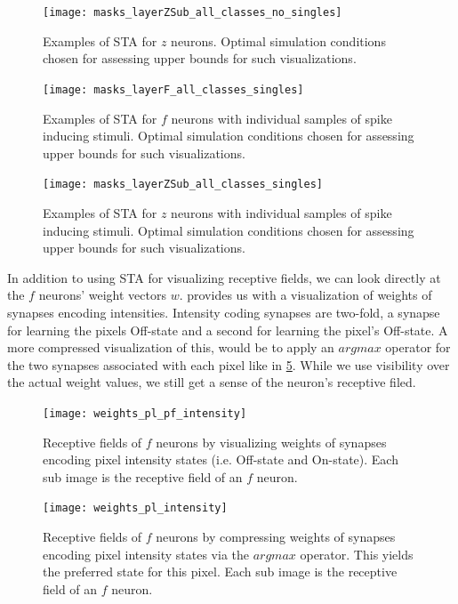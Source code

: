 \documentclass{report}
\begin{document}
\begin{figure}[ht]
\centering
\texttt{[image: masks\_layerZSub\_all\_classes\_no\_singles]}
\caption{Examples of STA for $z$ neurons. Optimal simulation conditions chosen for assessing upper bounds for such visualizations.
\label{fig:masks_layerZSub_all_classes_no_singles}}
\end{figure}

\begin{figure}[ht]
\centering
\texttt{[image: masks\_layerF\_all\_classes\_singles]}
\caption{Examples of STA for $f$ neurons with individual samples of spike inducing stimuli. Optimal simulation conditions chosen for assessing upper bounds for such visualizations.
\label{fig:masks_layerF_all_classes_singles}}
\end{figure}

\begin{figure}[ht]
\centering
\texttt{[image: masks\_layerZSub\_all\_classes\_singles]}
\caption{Examples of STA for $z$ neurons with individual samples of spike inducing stimuli. Optimal simulation conditions chosen for assessing upper bounds for such visualizations.
\label{fig:masks_layerZSub_all_classes_singles}}
\end{figure}

In addition to using STA for visualizing receptive fields, we can look directly at the $f$ neurons' weight vectors \textbf{$w$}.  provides us with a visualization of weights of synapses encoding intensities. Intensity coding synapses are two-fold, a synapse for learning the pixels Off-state and a second for learning the pixel's Off-state. A more compressed visualization of this, would be to apply an $argmax$ operator for the two synapses associated with each pixel like in \cref{fig:weights_pl_intensity}. While we use visibility over the actual weight values, we still get a sense of the neuron's receptive filed.

\begin{figure}[ht]
\centering
\texttt{[image: weights\_pl\_pf\_intensity]}
\caption{Receptive fields of $f$ neurons by visualizing weights of synapses encoding pixel intensity states (i.e. Off-state and On-state). Each sub image is the receptive field of an $f$ neuron.
\label{fig:weights_pl_pf_intensity}}
\end{figure}

\begin{figure}[ht]
\centering
\texttt{[image: weights\_pl\_intensity]}
\caption{Receptive fields of $f$ neurons by compressing weights of synapses encoding pixel intensity states via the $argmax$ operator. This yields the preferred state for this pixel. Each sub image is the receptive field of an $f$ neuron.
\label{fig:weights_pl_intensity}}
\end{figure}
\end{document}
